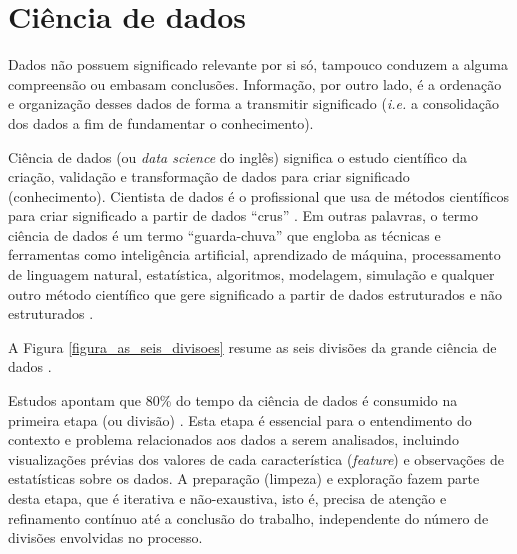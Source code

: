 \section{Ciência de dados}



Dados não possuem significado relevante por si só, tampouco conduzem a alguma compreensão ou embasam conclusões. Informação, por outro lado, é a ordenação e organização desses dados de forma a transmitir significado (\textit{i.e.} a consolidação dos dados a fim de fundamentar o conhecimento)\cite{dadosinfo2019diego}. 

Ciência de dados (ou \textit{data science} do inglês) significa o estudo científico da criação, validação e transformação de dados para criar significado (conhecimento). Cientista de dados é o profissional que usa de métodos científicos para criar significado a partir de dados ``crus'' \cite{dsa2013codeofconduct}.
Em outras palavras, o termo ciência de dados é um termo ``guarda-chuva'' que engloba as técnicas e ferramentas como inteligência artificial, aprendizado de máquina, processamento de linguagem natural, estatística, algoritmos, modelagem, simulação e qualquer outro método científico que gere significado a partir de dados estruturados e não estruturados \cite{survey}.

A Figura \ref{figura_as_seis_divisoes} resume as seis divisões da grande ciência de dados \cite{donoho201750}.

Estudos apontam que 80\% do tempo da ciência de dados é consumido na primeira etapa (ou divisão) \cite{donoho201750}. 
Esta etapa é essencial para o entendimento do contexto e problema relacionados aos dados a serem analisados, incluindo visualizações prévias dos valores de cada característica (\textit{feature}) e observações de estatísticas sobre os dados. 
A preparação (limpeza) e exploração fazem parte desta etapa, que é iterativa e não-exaustiva, isto é, precisa de atenção e refinamento contínuo até a conclusão do trabalho, independente do número de divisões envolvidas no processo.

